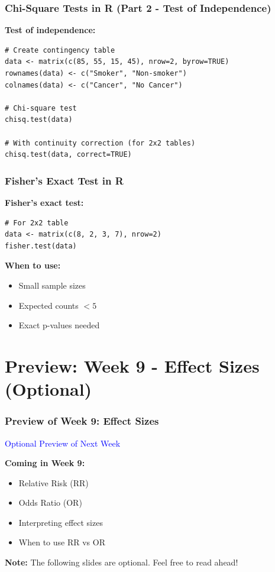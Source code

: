 \documentclass{beamer}
\begin{document}
\begin{frame}[fragile]
\frametitle{Chi-Square Tests in R (Part 2 - Test of Independence)}
\textbf{Test of independence:}
\begin{verbatim}
# Create contingency table
data <- matrix(c(85, 55, 15, 45), nrow=2, byrow=TRUE)
rownames(data) <- c("Smoker", "Non-smoker")
colnames(data) <- c("Cancer", "No Cancer")

# Chi-square test
chisq.test(data)

# With continuity correction (for 2x2 tables)
chisq.test(data, correct=TRUE)
\end{verbatim}
\end{frame}

\begin{frame}[fragile]
\frametitle{Fisher's Exact Test in R}
\textbf{Fisher's exact test:}
\begin{verbatim}
# For 2x2 table
data <- matrix(c(8, 2, 3, 7), nrow=2)
fisher.test(data)
\end{verbatim}

\vspace{0.5cm}
\textbf{When to use:}
\begin{itemize}
\item Small sample sizes
\item Expected counts $< 5$
\item Exact p-values needed
\end{itemize}
\end{frame}


\section{Preview: Week 9 - Effect Sizes (Optional)}

\begin{frame}
\frametitle{Preview of Week 9: Effect Sizes}
\begin{center}
\Large \textcolor{blue}{Optional Preview of Next Week}
\end{center}

\vspace{0.3cm}

\textbf{Coming in Week 9:}
\begin{itemize}\setlength\itemsep{0em}
\item Relative Risk (RR)
\item Odds Ratio (OR)
\item Interpreting effect sizes
\item When to use RR vs OR
\end{itemize}

\vspace{0.3cm}

\textbf{Note:} The following slides are optional. Feel free to read ahead!
\end{frame}
\end{document}
